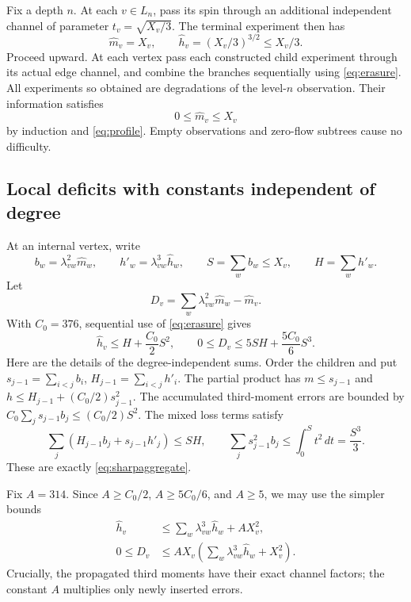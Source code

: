 Fix a depth $n$. At each $v\in L_n$, pass its spin through an additional
independent channel of parameter $t_v=\sqrt{X_v/3}$. The terminal
experiment then has
\begin{equation}\label{eq:terminal}
\widehat m_v=X_v,\qquad
\widehat h_v=(X_v/3)^{3/2}\le X_v/3.
\end{equation}
Proceed upward. At each vertex pass each constructed child experiment
through its actual edge channel, and combine the branches sequentially
using \eqref{eq:erasure}. All experiments so obtained are degradations
of the level-$n$ observation. Their information satisfies
\begin{equation}\label{eq:below}
0\le\widehat m_v\le X_v
\end{equation}
by induction and \eqref{eq:profile}. Empty observations and zero-flow
subtrees cause no difficulty.

\subsection{Local deficits with constants independent of degree}

At an internal vertex, write
\[
b_w=\lambda_{vw}^2\widehat m_w,\qquad
h'_w=\lambda_{vw}^3\widehat h_w,\qquad
S=\sum_w b_w\le X_v,\qquad H=\sum_w h'_w.
\]
Let
\begin{equation}\label{eq:deficit}
D_v=\sum_w\lambda_{vw}^2\widehat m_w-\widehat m_v.
\end{equation}
With $C_0=376$, sequential use of \eqref{eq:erasure} gives
\begin{equation}\label{eq:sharpaggregate}
\widehat h_v\le H+\frac{C_0}{2}S^2,
\qquad 0\le D_v\le5SH+\frac{5C_0}{6}S^3.
\end{equation}
Here are the details of the degree-independent sums. Order the children
and put $s_{j-1}=\sum_{i<j}b_i$, $H_{j-1}=\sum_{i<j}h'_i$.
The partial product has $m\le s_{j-1}$ and
$h\le H_{j-1}+(C_0/2)s_{j-1}^2$. The accumulated third-moment
errors are bounded by
$C_0\sum_j s_{j-1}b_j\le(C_0/2)S^2$.
The mixed loss terms satisfy
\[
\sum_j(H_{j-1}b_j+s_{j-1}h'_j)\le SH,
\qquad
\sum_j s_{j-1}^2b_j\le\int_0^S t^2\,dt=\frac{S^3}{3}.
\]
These are exactly \eqref{eq:sharpaggregate}.

Fix $A=314$. Since $A\ge C_0/2$, $A\ge5C_0/6$, and $A\ge5$,
we may use the simpler bounds
\begin{align}
\widehat h_v&\le\sum_w\lambda_{vw}^3\widehat h_w+AX_v^2,
\label{eq:hrec}\\
0\le D_v&\le AX_v\left(\sum_w\lambda_{vw}^3\widehat h_w+X_v^2\right).
\label{eq:drec}
\end{align}
Crucially, the propagated third moments have their exact channel factors;
the constant $A$ multiplies only newly inserted errors.

